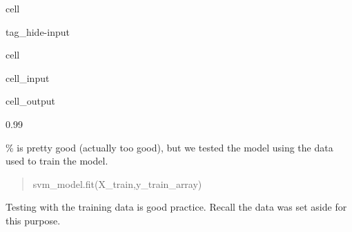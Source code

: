 \documentclass[letterpaper,10pt,english]{jupyterBook}
\begin{document}
\begin{sphinxuseclass}{cell}
\begin{sphinxuseclass}{tag_hide-input}
\end{sphinxuseclass}
\end{sphinxuseclass}
\begin{sphinxuseclass}{cell}\begin{sphinxVerbatimInput}

\begin{sphinxuseclass}{cell_input}
\begin{sphinxVerbatim}[commandchars=\\\{\}]
   
   
\end{sphinxVerbatim}

\end{sphinxuseclass}\end{sphinxVerbatimInput}
\begin{sphinxVerbatimOutput}

\begin{sphinxuseclass}{cell_output}
\begin{sphinxVerbatim}[commandchars=\\\{\}]
0.99
\end{sphinxVerbatim}

\end{sphinxuseclass}\end{sphinxVerbatimOutput}

\end{sphinxuseclass}
\% is pretty good (actually too good), but we tested the model using the  data used to train the model.
\begin{quote}

\sphinxAtStartPar
svm\_model.fit(X\_train,y\_train\_array)
\end{quote}

\sphinxAtStartPar
Testing with the training data is  good practice. Recall the  data was set aside for this purpose.
\end{document}
